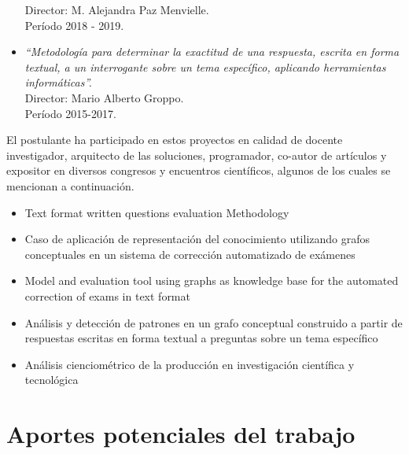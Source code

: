 \documentclass[
	11pt,oneside,a4paper,
	headsepline,footsepline,
	fleqn,
]{memoir}
\begin{document}
\begin{itemize}
	      Director: M. Alejandra Paz Menvielle. \\
	      Período 2018 - 2019.
	\item \emph{“Metodología para determinar la exactitud de una respuesta, escrita en forma textual, a un interrogante sobre un tema específico, aplicando herramientas informáticas”.} \\
	      Director: Mario Alberto Groppo. \\
	      Período 2015-2017.
\end{itemize}

El postulante ha participado en estos proyectos en calidad de docente investigador, arquitecto de las soluciones, programador, co-autor de artículos y expositor en diversos congresos y encuentros científicos, algunos de los cuales se mencionan a continuación.

\begin{itemize}
	\item Text format written questions evaluation Methodology\cite{Menvielle2016}
	\item Caso de aplicación de representación del conocimiento utilizando grafos conceptuales en un sistema de corrección automatizado de exámenes\cite{PazMenvielle2017}
	\item Model and evaluation tool using graphs as knowledge base for the automated correction of exams in text format\cite{Menvielle2017}
	\item Análisis y detección de patrones en un grafo conceptual construido a partir de respuestas escritas en forma textual a preguntas sobre un tema específico\cite{PazMenvielle2018}
	\item Análisis cienciométrico de la producción en investigación científica y tecnológica\cite{Munoz2020}
\end{itemize}

\section{Aportes potenciales del trabajo}
\end{document}
